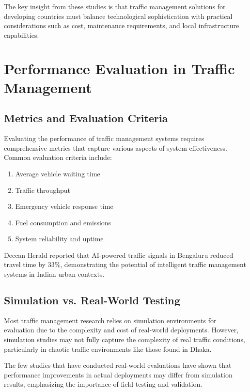 The key insight from these studies is that traffic management solutions for developing countries must balance technological sophistication with practical considerations such as cost, maintenance requirements, and local infrastructure capabilities.

\section{Performance Evaluation in Traffic Management}

\subsection{Metrics and Evaluation Criteria}

Evaluating the performance of traffic management systems requires comprehensive metrics that capture various aspects of system effectiveness. Common evaluation criteria include:

\begin{enumerate}
    \item Average vehicle waiting time
    \item Traffic throughput
    \item Emergency vehicle response time
    \item Fuel consumption and emissions
    \item System reliability and uptime
\end{enumerate}

Deccan Herald \cite{deccanherald2023ai} reported that AI-powered traffic signals in Bengaluru reduced travel time by 33\%, demonstrating the potential of intelligent traffic management systems in Indian urban contexts.

\subsection{Simulation vs. Real-World Testing}

Most traffic management research relies on simulation environments for evaluation due to the complexity and cost of real-world deployments. However, simulation studies may not fully capture the complexity of real traffic conditions, particularly in chaotic traffic environments like those found in Dhaka.

The few studies that have conducted real-world evaluations have shown that performance improvements in actual deployments may differ from simulation results, emphasizing the importance of field testing and validation.

